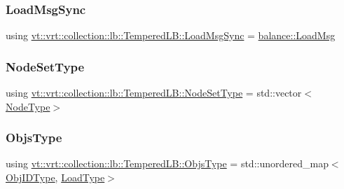 \mbox{\label{structvt_1_1vrt_1_1collection_1_1lb_1_1_tempered_l_b_aa46eb8cbc4c505f35b970f75e38b5e0d}} 
\subsubsection{\texorpdfstring{Load\+Msg\+Sync}{LoadMsgSync}}
{\footnotesize\ttfamily using \hyperlink{structvt_1_1vrt_1_1collection_1_1lb_1_1_tempered_l_b_aa46eb8cbc4c505f35b970f75e38b5e0d}{vt\+::vrt\+::collection\+::lb\+::\+Tempered\+L\+B\+::\+Load\+Msg\+Sync} =  \hyperlink{structvt_1_1vrt_1_1collection_1_1balance_1_1_load_msg}{balance\+::\+Load\+Msg}}

\mbox{\label{structvt_1_1vrt_1_1collection_1_1lb_1_1_tempered_l_b_aa18a0edaf10119e307e7209371caa673}} 
\subsubsection{\texorpdfstring{Node\+Set\+Type}{NodeSetType}}
{\footnotesize\ttfamily using \hyperlink{structvt_1_1vrt_1_1collection_1_1lb_1_1_tempered_l_b_aa18a0edaf10119e307e7209371caa673}{vt\+::vrt\+::collection\+::lb\+::\+Tempered\+L\+B\+::\+Node\+Set\+Type} =  std\+::vector$<$\hyperlink{namespacevt_a866da9d0efc19c0a1ce79e9e492f47e2}{Node\+Type}$>$}

\mbox{\label{structvt_1_1vrt_1_1collection_1_1lb_1_1_tempered_l_b_ad54faf59319f1b33dec689ee853d688e}} 
\subsubsection{\texorpdfstring{Objs\+Type}{ObjsType}}
{\footnotesize\ttfamily using \hyperlink{structvt_1_1vrt_1_1collection_1_1lb_1_1_tempered_l_b_ad54faf59319f1b33dec689ee853d688e}{vt\+::vrt\+::collection\+::lb\+::\+Tempered\+L\+B\+::\+Objs\+Type} =  std\+::unordered\+\_\+map$<$\hyperlink{structvt_1_1vrt_1_1collection_1_1lb_1_1_base_l_b_a790b22acf448880599724749cdc4e9b3}{Obj\+I\+D\+Type}, \hyperlink{structvt_1_1vrt_1_1collection_1_1lb_1_1_base_l_b_a215e22b9f12678303f49615ae3be05cc}{Load\+Type}$>$}

